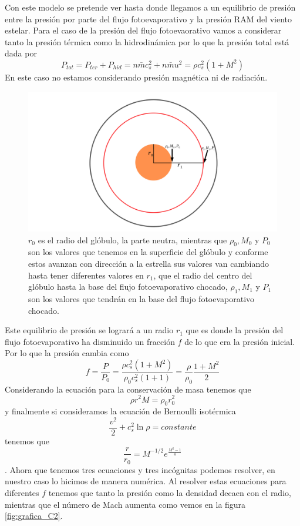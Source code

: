\documentclass{book}
\begin{document}
Con este modelo se pretende ver hasta donde llegamos a un equilibrio de presión entre la presión por parte del flujo fotoevaporativo y la presión RAM del viento estelar. Para el caso de la presión del flujo fotoevaorativo vamos a considerar tanto la presión térmica como la hidrodinámica por lo que la presión total está dada por
\[P_{tot}=P_{ter}+P_{hid}=n\bar{m}c_s^2+n\bar{m}u^2=\rho c_s^2(1+M^2)\]
En este caso no estamos considerando presión magnética ni de radiación.

\begin{figure}[h]
    \centering \includegraphics[width=\textwidth]{artesanales/ImgFi01-3.pdf}
    \caption{$r_0$ es el radio del glóbulo, la parte neutra, mientras que $\rho_0,M_0$ y $P_0$ son los valores que tenemos en la superficie del glóbulo y conforme estos avanzan con dirección a la estrella sus valores van cambiando hasta tener diferentes valores en $r_1$, que el radio del centro del glóbulo hasta la base del flujo fotoevaporativo chocado, $\rho_1,M_1$ y $P_1$ son los valores que tendrán en la base del flujo fotoevaporativo chocado.}
    \label{fig:parameters}
\end{figure}

Este equilibrio de presión se logrará a un radio $r_1$ que es donde la presión del flujo fotoevaporativo ha disminuido un fracción $f$ de lo que era la presión inicial. Por lo que la presión cambia como 
\[f=\frac{P}{P_0}=\frac{\rho c_s^2(1+M^2)}{\rho_0 c_s^2(1+1)}=\frac{\rho}{\rho_0}\frac{1+M^2}{2}\]
Considerando la ecuación para la conservación de masa tenemos que
\[\rho r^2M	=\rho_0 r_0^2\]
y finalmente si consideramos la ecuación de Bernoulli isotérmica 
\[\frac{v^2}{2}+c_s^2\ln\rho=constante\]
tenemos que 
\[\frac{r}{r_0}=M^{-1/2}e^{\frac{M^2-1}{4}}\] \cite{Dyson:1968}.
Ahora que tenemos tres ecuaciones y tres incógnitas podemos resolver, en nuestro caso lo hicimos de manera numérica. Al resolver estas ecuaciones para diferentes $f$ tenemos que tanto la presión como la densidad decaen con el radio, mientras que el número de Mach aumenta como vemos en la figura \ref{fig:grafica_C2}.
\end{document}
